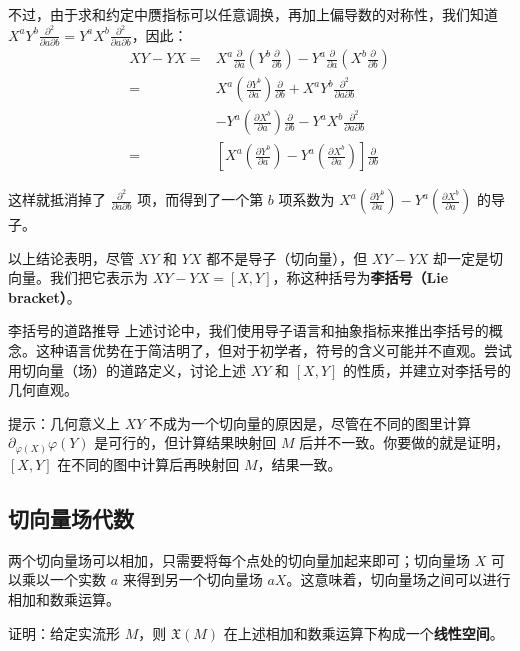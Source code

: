 不过，由于求和约定中赝指标可以任意调换，再加上偏导数的对称性，我们知道 $X^aY^b\frac{\partial^2}{\partial a\partial b}=Y^aX^b\frac{\partial^2}{\partial a\partial b}$，因此：
\begin{equation}
\begin{aligned}
XY-YX=&X^a\frac{\partial}{\partial a}(Y^b\frac{\partial}{\partial b})-Y^a\frac{\partial}{\partial a}(X^b\frac{\partial}{\partial b})\\
=&X^a(\frac{\partial Y^b}{\partial a})\frac{\partial}{\partial b}+X^aY^b\frac{\partial^2}{\partial a\partial b}\\&-Y^a(\frac{\partial X^b}{\partial a})\frac{\partial}{\partial b}-Y^aX^b\frac{\partial^2}{\partial a\partial b}\\
=&[X^a(\frac{\partial Y^b}{\partial a})-Y^a(\frac{\partial X^b}{\partial a})]\frac{\partial}{\partial b}
\end{aligned}
\end{equation}

这样就抵消掉了 $\frac{\partial^2}{\partial a\partial b}$ 项，而得到了一个第 $b$ 项系数为 $X^a(\frac{\partial Y^b}{\partial a})-Y^a(\frac{\partial X^b}{\partial a})$ 的导子。

以上结论表明，尽管 $XY$ 和 $YX$ 都不是导子（切向量），但 $XY-YX$ 却一定是切向量。我们把它表示为 $XY-YX=[X, Y]$，称这种括号为\textbf{李括号（Lie bracket）}。

\begin{exercise}{李括号的道路推导}\label{Vec_exe1}
上述讨论中，我们使用导子语言和抽象指标来推出李括号的概念。这种语言优势在于简洁明了，但对于初学者，符号的含义可能并不直观。尝试用切向量（场）的道路定义，讨论上述 $XY$ 和 $[X, Y]$ 的性质，并建立对李括号的几何直观。

提示：几何意义上 $XY$ 不成为一个切向量的原因是，尽管在不同的图里计算 $\partial_{\varphi(X)}\varphi(Y)$ 是可行的，但计算结果映射回 $M$ 后并不一致。你要做的就是证明，$[X, Y]$ 在不同的图中计算后再映射回 $M$，结果一致。
\end{exercise}

\subsection{切向量场代数}

两个切向量场可以相加，只需要将每个点处的切向量加起来即可；切向量场 $X$ 可以乘以一个实数 $a$ 来得到另一个切向量场 $aX$。这意味着，切向量场之间可以进行相加和数乘运算。

\begin{exercise}{}\label{Vec_exe2}
证明：给定实流形 $M$，则 $\mathfrak{X}(M)$ 在上述相加和数乘运算下构成一个\textbf{线性空间}。
\end{exercise}

